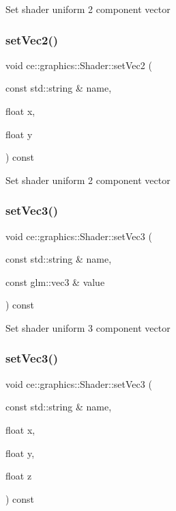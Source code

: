 Set shader uniform 2 component vector \mbox{\label{classce_1_1graphics_1_1_shader_aba50173108bd30bcf6f1a4a0446d6a09}} 
\subsubsection{\texorpdfstring{set\+Vec2()}{setVec2()}\hspace{0.1cm}{\footnotesize\ttfamily [2/2]}}
{\footnotesize\ttfamily void ce\+::graphics\+::\+Shader\+::set\+Vec2 (\begin{DoxyParamCaption}\item[{const std\+::string \&}]{name,  }\item[{float}]{x,  }\item[{float}]{y }\end{DoxyParamCaption}) const}

Set shader uniform 2 component vector \mbox{\label{classce_1_1graphics_1_1_shader_ad2ed1ba06e20251009c869e4344605ef}} 
\subsubsection{\texorpdfstring{set\+Vec3()}{setVec3()}\hspace{0.1cm}{\footnotesize\ttfamily [1/2]}}
{\footnotesize\ttfamily void ce\+::graphics\+::\+Shader\+::set\+Vec3 (\begin{DoxyParamCaption}\item[{const std\+::string \&}]{name,  }\item[{const glm\+::vec3 \&}]{value }\end{DoxyParamCaption}) const}

Set shader uniform 3 component vector \mbox{\label{classce_1_1graphics_1_1_shader_aee1a36cd3264b09aed26b99c0fea05ad}} 
\subsubsection{\texorpdfstring{set\+Vec3()}{setVec3()}\hspace{0.1cm}{\footnotesize\ttfamily [2/2]}}
{\footnotesize\ttfamily void ce\+::graphics\+::\+Shader\+::set\+Vec3 (\begin{DoxyParamCaption}\item[{const std\+::string \&}]{name,  }\item[{float}]{x,  }\item[{float}]{y,  }\item[{float}]{z }\end{DoxyParamCaption}) const}

